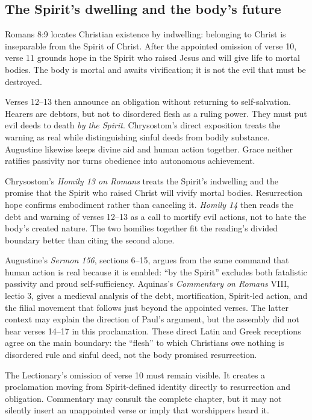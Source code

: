 \begin{deepstudy}
\subsection*{The Spirit's dwelling and the body's future\enspace{}}

Romans 8:9 locates Christian existence by indwelling: belonging to Christ is inseparable from the Spirit of Christ. After the appointed omission of verse 10, verse 11 grounds hope in the Spirit who raised Jesus and will give life to mortal bodies. The body is mortal and awaits vivification; it is not the evil that must be destroyed.

Verses 12--13 then announce an obligation without returning to self-salvation. Hearers are debtors, but not to disordered flesh as a ruling power. They must put evil deeds to death \emph{by the Spirit}. Chrysostom's direct exposition treats the warning as real while distinguishing sinful deeds from bodily substance. Augustine likewise keeps divine aid and human action together. Grace neither ratifies passivity nor turns obedience into autonomous achievement.

Chrysostom's \emph{Homily 13 on Romans} treats the Spirit's indwelling and the promise that the Spirit who raised Christ will vivify mortal bodies. Resurrection hope confirms embodiment rather than canceling it. \emph{Homily 14} then reads the debt and warning of verses 12--13 as a call to mortify evil actions, not to hate the body's created nature. The two homilies together fit the reading's divided boundary better than citing the second alone.

Augustine's \emph{Sermon 156}, sections 6--15, argues from the same command that human action is real because it is enabled: “by the Spirit” excludes both fatalistic passivity and proud self-sufficiency. Aquinas's \emph{Commentary on Romans} VIII, lectio 3, gives a medieval analysis of the debt, mortification, Spirit-led action, and the filial movement that follows just beyond the appointed verses. The latter context may explain the direction of Paul's argument, but the assembly did not hear verses 14--17 in this proclamation. These direct Latin and Greek receptions agree on the main boundary: the “flesh” to which Christians owe nothing is disordered rule and sinful deed, not the body promised resurrection.

The Lectionary's omission of verse 10 must remain visible. It creates a proclamation moving from Spirit-defined identity directly to resurrection and obligation. Commentary may consult the complete chapter, but it may not silently insert an unappointed verse or imply that worshippers heard it.


\end{deepstudy}
